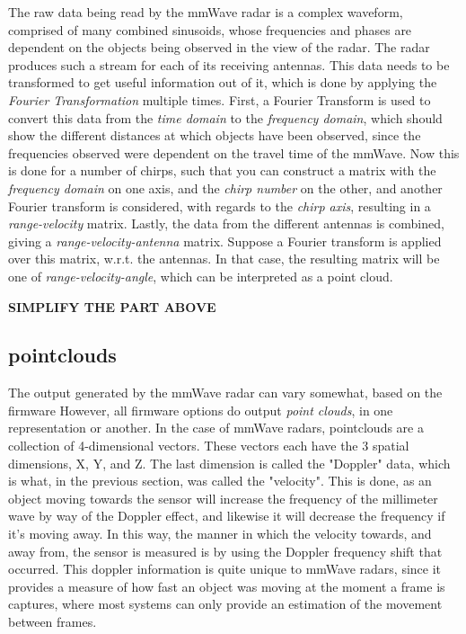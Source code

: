 The raw data being read by the mmWave radar is a complex waveform, comprised of many combined sinusoids, whose frequencies and phases are dependent on the objects being observed in the view of the radar.
The radar produces such a stream for each of its receiving antennas.
This data needs to be transformed to get useful information out of it, which is done by applying the \textit{Fourier Transformation} multiple times.
First, a Fourier Transform is used to convert this data from the \textit{time domain} to the \textit{frequency domain}, which should show the different distances at which objects have been observed, since the frequencies observed were dependent on the travel time of the mmWave.
Now this is done for a number of chirps, such that you can construct a matrix with the \textit{frequency domain} on one axis, and the \textit{chirp number} on the other, and another Fourier transform is considered, with regards to the \textit{chirp axis}, resulting in a \textit{range-velocity} matrix.
Lastly, the data from the different antennas is combined, giving a \textit{range-velocity-antenna} matrix. 
Suppose a Fourier transform is applied over this matrix, w.r.t. the antennas. 
In that case, the resulting matrix will be one of \textit{range-velocity-angle}, which can be interpreted as a point cloud.

\textbf{SIMPLIFY THE PART ABOVE}


\subsection{pointclouds}
\label{subsection: background - millimeter wave radar - pointclouds}

The output generated by the mmWave radar can vary somewhat, based on the firmware 
However, all firmware options do output \textit{point clouds}, in one representation or another.
In the case of mmWave radars, pointclouds are a collection of 4-dimensional vectors.
These vectors each have the 3 spatial dimensions, X, Y, and Z.
The last dimension is called the "Doppler" data, which is what, in the previous section, was called the "velocity".
This is done, as an object moving towards the sensor will increase the frequency of the millimeter wave by way of the Doppler effect, and likewise it will decrease the frequency if it's moving away.
In this way, the manner in which the velocity towards, and away from, the sensor is measured is by using the Doppler frequency shift that occurred.
This doppler information is quite unique to mmWave radars, since it provides a measure of how fast an object was moving at the moment a frame is captures, where most systems can only provide an estimation of the movement between frames.

